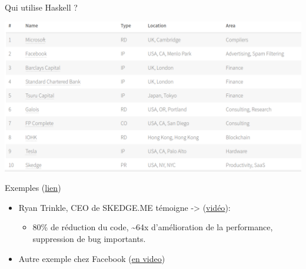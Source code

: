 \documentclass[presentation]{beamer}
\begin{document}
\begin{frame}[label={sec:org01cc241}]{Qui utilise Haskell ?}
\begin{center}
\includegraphics[height=.5\textheight]{Images/quiUtiliseHaskell.png}
\end{center}
\begin{block}{Exemples (\href{https://haskellcosm.com/}{lien})}
\begin{itemize}
\item Ryan Trinkle,  CEO de SKEDGE.ME témoigne -> (\href{https://www.youtube.com/watch?v=BveDrw9CwEg}{vidéo}):
\begin{itemize}
\item 80\% de réduction du code, \textasciitilde{}64x d'amélioration de la performance, suppression de bug importants.
\end{itemize}
\item Autre exemple chez Facebook (\href{https://www.youtube.com/watch?v=mlTO510zO78}{en video})
\end{itemize}
\end{block}
\end{frame}
\end{document}
